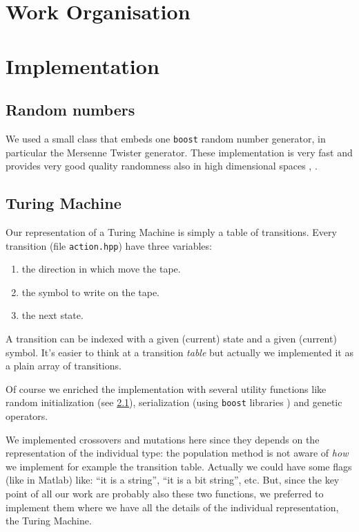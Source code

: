 \documentclass{report}
\begin{document}
\chapter{Work Organisation}
\label{chap:wo}

\chapter{Implementation}
\label{chap:impl}

\section{Random numbers}
\label{sec:random}
We used a small class that embeds one \texttt{boost} random number generator, in particular the Mersenne Twister generator. These implementation is very fast and provides very good quality randomness also in high dimensional spaces \cite{boost-random}, \cite{mersenne-twister}.

\section{Turing Machine}
Our representation of a Turing Machine is simply a table of transitions. Every transition (file \texttt{action.hpp}) have three variables:
\begin{enumerate}
\item the direction in which move the tape.
\item the symbol to write on the tape.
\item the next state.
\end{enumerate}
A transition can be indexed with a given (current) state and a given (current) symbol. It's easier to think at a transition \textit{table} but actually we implemented it as a plain array of transitions.

Of course we enriched the implementation with several utility functions like random initialization (see \ref{sec:random}), serialization (using \texttt{boost} libraries \cite{boost-serialization}) and genetic operators.

We implemented crossovers and mutations here since they depends on the representation of the individual type: the population method is not aware of \textit{how} we implement for example the transition table. Actually we could have some flags (like in Matlab) like: ``it is a string'', ``it is a bit string'', etc. But, since the key point of all our work are probably also these two functions, we preferred to implement them where we have all the details of the individual representation, the Turing Machine.
\end{document}
